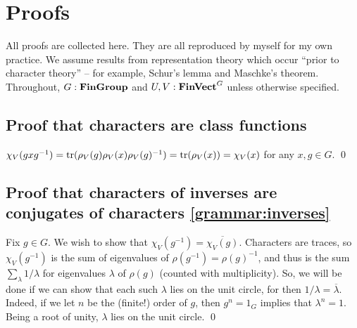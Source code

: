 \section{Proofs} \label{sec:proofs} %
\pan All proofs are collected here. They are all reproduced by myself for my own practice. We assume results from representation theory which occur ``prior to character theory'' -- for example, Schur's lemma and Maschke's theorem. Throughout, $G : \operatorname{\mathbf{FinGroup}}$ and $U, V : \operatorname{\mathbf{FinVect}}^G$ unless otherwise specified.

\subsection{Proof that characters are class functions} %
\pan $\chi_V (g x g^{-1}) = \operatorname{tr} (\rho_V (g) \rho_V (x) \rho_V (g)^{-1}) = \operatorname{tr} (\rho_V (x)) = \chi_V (x)$ for any $x, g \in G$. \qed

\subsection{Proof that characters of inverses are conjugates of characters \ref{grammar:inverses}} %
\pan Fix $g \in G$. We wish to show that $\chi_V (g^{-1}) = \overline{\chi_V (g)}$. Characters are traces, so $\chi_V (g^{-1})$ is the sum of eigenvalues of $\rho(g^{-1}) = \rho(g)^{-1}$, and thus is the sum $\sum_{\lambda} 1 / \lambda$ for eigenvalues $\lambda$ of $\rho(g)$ (counted with multiplicity). So, we will be done if we can show that each such $\lambda$ lies on the unit circle, for then $1 / \lambda = \overline{\lambda}$. Indeed, if we let $n$ be the (finite!) order of $g$, then $g^n = 1_G$ implies that $\lambda^n = 1$. Being a root of unity, $\lambda$ lies on the unit circle. \qed

